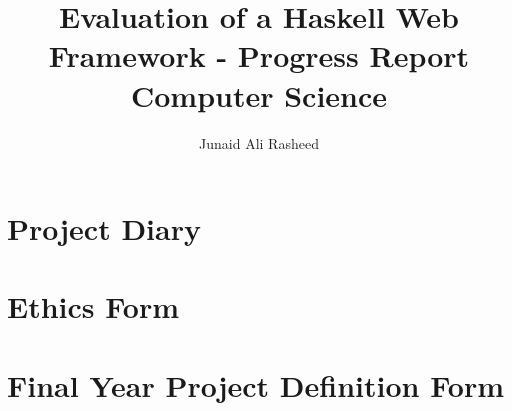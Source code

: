 \documentclass[a4paper,11pt]{report}
\title{Evaluation of a Haskell Web Framework - Progress Report \\ Computer Science}
\author{Junaid Ali Rasheed}
\begin{document}
\maketitle
\tableofcontents
\newpage






\printbibliography[heading=bibintoc,title={References}]

\begin{appendices}

\chapter{Project Diary}


\chapter{Ethics Form}


\chapter{Final Year Project Definition Form}


\end{appendices}
\end{document}
